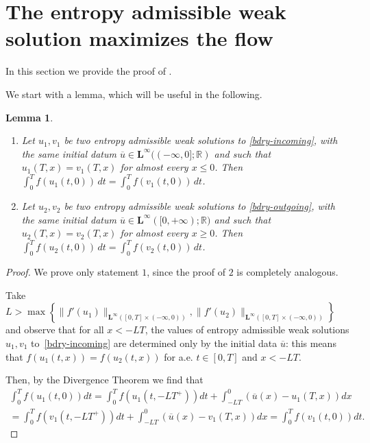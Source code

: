 \documentclass[a4paper, 10pt, final]{article}
\newtheorem{lemma}{Lemma}[section]
\newcommand{\R}{\mathbb{R}} \newcommand{\N}{\mathbb{N}}
\newcommand{\LL}[1]{\mathbf{L^{#1}}}
\begin{document}
\section{The entropy  admissible weak solution  maximizes the flow} 
\label{sec:entrsolmax}
In this section we provide the proof of .  

We start with a lemma, which will be useful in the following. 

\begin{lemma}
  \label{uniq} \  \ 
  \begin{enumerate}
    \item Let $u_1, v_1$ be two entropy admissible  weak solutions to \eqref{bdry-incoming}, 
      with the same  initial datum $\overline u\in \mathbf{L^\infty}
      ((-\infty, 0]; \R)$ and 
      such that $u_1(T,x)=
      v_1(T,x)$ for almost every $x\leq 0$. 
      Then  $\int_0^T f(u_1(t,0))\,dt=\int_0^T f(v_1(t,0))\,dt$.

    \item Let  $u_2, v_2$
      be two entropy admissible  weak solutions to \eqref{bdry-outgoing}, with the same  initial datum $\overline u\in \mathbf{L^\infty}
      ([0,+\infty); \R)$ and 
      such that $u_2(T,x)=
      v_2(T,x)$ for almost every $x\geq 0$. 
      Then  $\int_0^T f(u_2(t,0))\,dt = \int_0^T f(v_2(t,0))\, dt$. 
  \end{enumerate} 
\end{lemma}

\begin{proof} 
We prove only statement $1$, since the proof of $2$ is completely analogous. 

Take $L > \max\left\{ \|f'(u_1)\|_{\LL\infty([0,T]\times (-\infty, 0))}, 
  \|f'(u_2)\|_{\LL\infty([0,T]\times (-\infty, 0))}\right\}$ and observe that for all $x<-LT$, the  values of  entropy  
   admissible  weak  solutions $u_1,v_1$ to~\eqref{bdry-incoming} are
determined only by the initial data $\overline u$: this means that $f(u_1(t,x))=f(u_2(t,x))$ for a.e. $t\in [0,T]$ and $x<-LT$.  




Then, by the Divergence Theorem   we find that 
\begin{multline*} \int_0^T f(u_1(t,0))dt= \int_0^T f(u_1(t,-LT^+))dt+\int_{-LT}^0 (\overline u(x)-u_1(T,x)) dx
\\ = \int_0^T f(v_1(t,-LT^+))dt+\int_{-LT}^0 (\overline u(x)-v_1(T,x)) dx=\int_0^T
f(v_1(t,0))dt.\end{multline*} 
\end{proof} 
\end{document}
